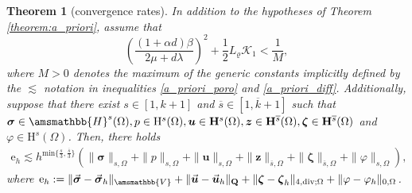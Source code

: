 \documentclass[fleqn,a4paper]{cas-sc}
\newcommand\vdiv{\mathop{\mathrm{div}}\nolimits}
\newcommand{\bu}{\boldsymbol{u}}
\newcommand{\bz}{\boldsymbol{z}}
\newcommand{\bzeta}{\boldsymbol{\zeta}}
\newcommand{\0}{\boldsymbol{0}}
\newcommand\bQ{\mathbf{Q}}
\newcommand\bbV{\amsmathbb{V}}
\newcommand\bbH{\amsmathbb{H}}
\newcommand\bH{\mathbf{H}}
\newcommand\bsigma{\boldsymbol{\sigma}}
\numberwithin{equation}{section}
\numberwithin{figure}{section}
\newtheorem{theorem}{Theorem}[section]
\begin{document}
\begin{theorem}[convergence rates]\label{th:convergence}
    In addition to the hypotheses of Theorem \ref{theorem:a_priori}, assume that $$\left(\frac{(1+\alpha d)\beta}{2\mu+d\lambda}\right)^2+\frac{1}{2}L_{\varrho}\mathcal{K}_1< \frac{1}{M},$$
     where $M > 0$ denotes the maximum of the generic constants implicitly defined by the $\lesssim$ notation in inequalities \eqref{a_priori_poro} and \eqref{a_priori_diff}. Additionally, suppose that there exist $s \in [1, k+1]$ and $\overline{s} \in [1, \overline{k}+1]$ such that $\bsigma\in \bbH^{s}(\Omega),p\in \mathrm{H}^{s}(\Omega), \bu\in \bH^{s}(\Omega), \bz \in \bH^{\overline{s}}(\Omega),\bzeta \in \bH^{\overline{s}}(\Omega)$ and $\varphi\in \mathrm{H}^{s}(\Omega)$. Then, there holds
    \begin{align*}
        \mathrm{e}_h \lesssim h^{\mathrm{min}\{\frac{s}{3},\frac{\overline{s}}{3}\}}\left(\|\bsigma\|_{s,\Omega}+\|p\|_{s,\Omega}+\|\bu\|_{s,\Omega}+\|\bz\|_{\overline{s},\Omega}+\|\bzeta\|_{\overline{s},\Omega} + \|\varphi\|_{s,\Omega}\right), 
    \end{align*}
    where $\mathrm{e}_h:=\|\vec{\bsigma}-\vec{\bsigma}_h\|_{\bbV} + \|\vec{\bu}-\vec{\bu}_h\|_{\bQ }+     \| \bzeta-\bzeta_h\|_{4,\vdiv;\Omega}+\|\varphi-\varphi_h\|_{0,\Omega}$.
\end{theorem}
\end{document}

